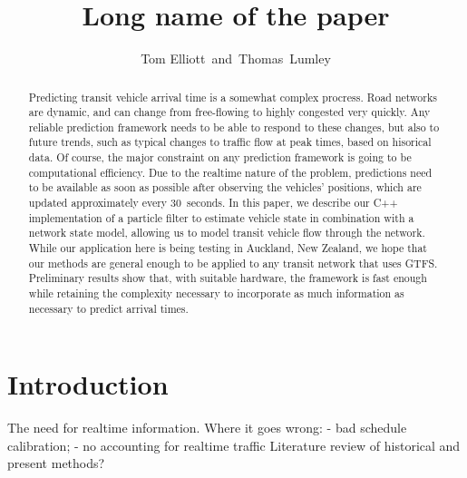 \documentclass[times, doublespace]{anzsauth}
\begin{document}
\cleanlookdateon
{}
\title{Long name of the paper}
\author{Tom Elliott\corrauth~and~Thomas~Lumley}
\address{
    Department of Statistics, University of Auckland,\\
    Private Bag 92019, Auckland 1142, New Zealand\\
    Email: \texttt{tom.elliott@auckland.ac.nz}
}

\begin{abstract}
Predicting transit vehicle arrival time is a somewhat complex procress.
Road networks are dynamic, and can change from free-flowing to highly congested
very quickly.
Any reliable prediction framework needs to be able to respond to these changes,
but also to future trends, such as typical changes to traffic flow
at peak times, based on hisorical data.
Of course, the major constraint on any prediction framework is going to be
computational efficiency.
Due to the realtime nature of the problem, predictions need to be 
available as soon as possible after observing the vehicles' positions,
which are updated approximately every 30~seconds.
In this paper, we describe our C++ implementation of a particle filter to estimate
vehicle state in combination with a network state model,
allowing us to model transit vehicle flow through the network.
While our application here is being testing in Auckland, New Zealand,
we hope that our methods are general enough to be applied to any
transit network that uses GTFS.
Preliminary results show that, with suitable hardware,
the framework is fast enough while retaining the complexity necessary
to incorporate as much information as necessary to predict arrival times.
\end{abstract}


\maketitle
\section{Introduction}
\label{sec:intro}


The need for realtime information.
Where it goes wrong: 
- bad schedule calibration;
- no accounting for realtime traffic 
Literature review of historical and present methods?
\end{document}
